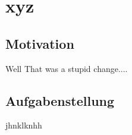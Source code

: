 \chapter{xyz}

\section{Motivation}
\label{sec:Sektion 1}
Well That was a stupid change....
\section{Aufgabenstellung}
\label{sec:Sektion 2}
jhnklknhh

